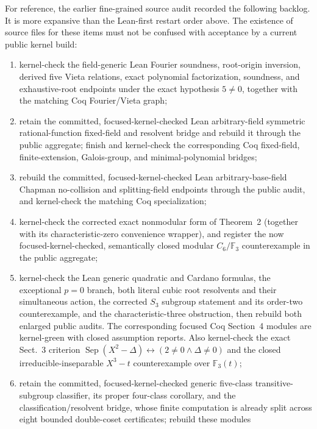 \documentclass[11pt,a4paper,oneside]{article}
\begin{document}
For reference, the earlier fine-grained source audit recorded the following
backlog.  It is more expansive than the Lean-first restart order above.  The
existence of source files for these items must not be confused with acceptance
by a current public kernel build:

\begin{enumerate}
\item kernel-check the field-generic Lean Fourier soundness, root-origin
  inversion, derived five Vieta relations, exact polynomial factorization,
  soundness, and exhaustive-root endpoints under the exact hypothesis
  $5\ne0$, together with the matching Coq Fourier/Vieta graph;
\item retain the committed, focused-kernel-checked Lean arbitrary-field
  symmetric rational-function fixed-field and resolvent bridge and rebuild it
  through the public aggregate; finish and kernel-check the corresponding Coq
  fixed-field, finite-extension, Galois-group, and minimal-polynomial bridges;
\item rebuild the committed, focused-kernel-checked Lean arbitrary-base-field
  Chapman no-collision and splitting-field endpoints through the public audit,
  and kernel-check the matching Coq specialization;
\item kernel-check the corrected exact nonmodular form of Theorem~2 (together
  with its characteristic-zero convenience wrapper), and register the now
  focused-kernel-checked, semantically closed modular $C_6/\mathbb F_3$
  counterexample in the public aggregate;
\item kernel-check the Lean generic quadratic and Cardano formulas, the
  exceptional $p=0$ branch, both literal cubic root resolvents and their
  simultaneous action, the corrected $S_3$ subgroup statement and its
  order-two counterexample, and the characteristic-three obstruction, then
  rebuild both enlarged public audits.  The corresponding focused Coq
  Section~4 modules are kernel-green with closed assumption reports.  Also
  kernel-check the exact Sect.~3 criterion
  $\operatorname{Sep}(X^2-\Delta)\leftrightarrow(2\ne0\wedge\Delta\ne0)$
  and the closed irreducible-inseparable $X^3-t$ counterexample over
  $\mathbb F_3(t)$;
\item retain the committed, focused-kernel-checked generic five-class
  transitive-subgroup classifier, its proper four-class corollary, and the
  classification/resolvent bridge, whose finite computation is already split
  across eight bounded double-coset certificates; rebuild these modules

\end{enumerate}
\end{document}
